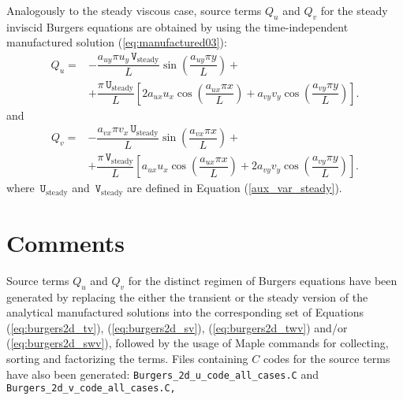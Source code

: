 \documentclass[10pt]{article}
\newcommand{\U}{\,\mathtt{U}}
\newcommand{\V}{\,\mathtt{V}}
\begin{document}
%
Analogously to the steady viscous case, source terms $Q_u$ and $Q_v$ for the steady inviscid Burgers equations are  obtained by using the time-independent  manufactured solution (\ref{eq:manufactured03}):
\begin{equation}
\begin{split}\label{sourceQu_t}
Q_u = &-\dfrac{a_{uy} \pi u_y \V_\text{steady} }{L}\sin\left(\dfrac{a_{uy} \pi y}{L}\right)+\\
 &+\dfrac{\pi \U_\text{steady}}{L}\left[2 a_{ux} u_x \cos\left(\dfrac{a_{ux} \pi x}{L}\right)+a_{vy} v_y \cos\left(\dfrac{a_{vy} \pi y}{L}\right)\right].
\end{split}
 \end{equation}
and
\begin{equation}
\begin{split}
Q_v =  &-\dfrac{a_{vx} \pi v_x \U_\text{steady} }{L}\sin\left(\dfrac{a_{vx} \pi x}{L}\right)+\\
 &+\dfrac{\pi \V_\text{steady}}{L}\left[a_{ux} u_x \cos\left(\dfrac{a_{ux} \pi x}{L}\right)+2 a_{vy} v_y \cos\left(\dfrac{a_{vy} \pi y}{L}\right)\right] .
\end{split}
\end{equation}
where  $\U_\text{steady}$ and $\V_\text{steady}$ are defined in  Equation (\ref{aux_var_steady}).






\section{Comments}

Source terms $Q_u$ and $Q_v$ for the distinct regimen of Burgers equations have been generated by replacing the either the transient or the steady version of the analytical  manufactured solutions into the corresponding set of Equations (\ref{eq:burgers2d_tv}), (\ref{eq:burgers2d_sv}), (\ref{eq:burgers2d_twv}) and/or (\ref{eq:burgers2d_swv}), followed by the usage of Maple commands for collecting, sorting and factorizing the terms. Files containing $C$ codes for the source terms have also been generated:  \texttt{Burgers\_2d\_u\_code\_all\_cases.C} and \texttt{Burgers\_2d\_v\_code\_all\_cases.C,}
\end{document}
